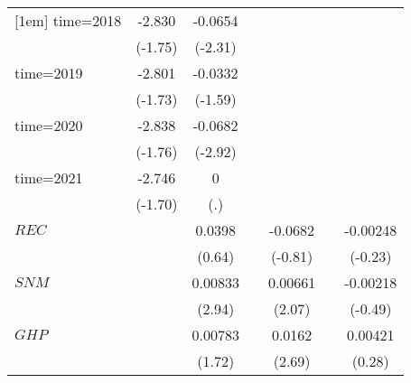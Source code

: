 \begin{table}[htbp]
\begin{tabular}{l*{6}{c}}
[1em]
time=2018           &      -2.830\sym{*}  &     -0.0654\sym{**} &                     &                     &                     &                     \\
                    &     (-1.75)         &     (-2.31)         &                     &                     &                     &                     \\
[1em]
time=2019           &      -2.801\sym{*}  &     -0.0332         &                     &                     &                     &                     \\
                    &     (-1.73)         &     (-1.59)         &                     &                     &                     &                     \\
[1em]
time=2020           &      -2.838\sym{*}  &     -0.0682\sym{***}&                     &                     &                     &                     \\
                    &     (-1.76)         &     (-2.92)         &                     &                     &                     &                     \\
[1em]
time=2021           &      -2.746         &           0         &                     &                     &                     &                     \\
                    &     (-1.70)         &         (.)         &                     &                     &                     &                     \\
[1em]
$ REC $             &                     &      0.0398         &                     &     -0.0682         &                     &    -0.00248         \\
                    &                     &      (0.64)         &                     &     (-0.81)         &                     &     (-0.23)         \\
[1em]
$ SNM $             &                     &     0.00833\sym{***}&                     &     0.00661\sym{*}  &                     &    -0.00218         \\
                    &                     &      (2.94)         &                     &      (2.07)         &                     &     (-0.49)         \\
[1em]
$ GHP $             &                     &     0.00783         &                     &      0.0162\sym{**} &                     &     0.00421         \\
                    &                     &      (1.72)         &                     &      (2.69)         &                     &      (0.28)         \\

\end{tabular}
\end{table}
